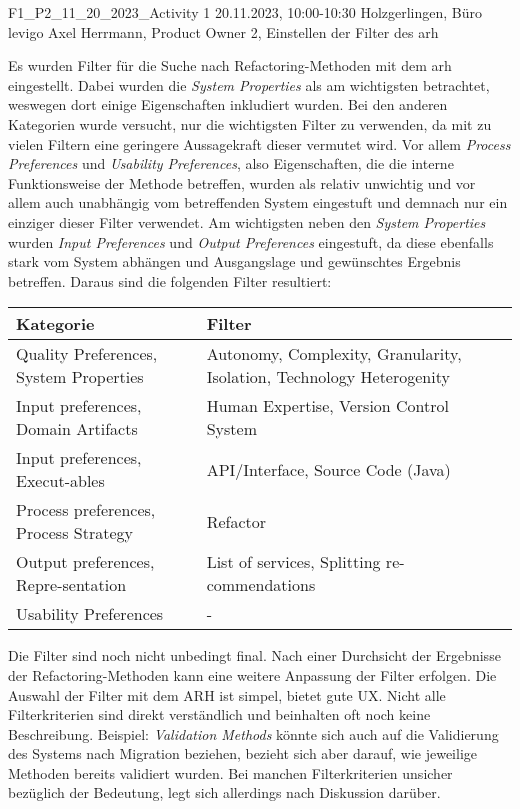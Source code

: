 \fieldnote
{F1\_P2\_11\_20\_2023\_Activity}
{1}
{20.11.2023, 10:00-10:30}
{Holzgerlingen, Büro levigo}
{Axel Herrmann, Product Owner}
{2, Einstellen der Filter des \gls{arh}}
{
	Es wurden Filter für die Suche nach Refactoring-Methoden mit dem \gls{arh} eingestellt. 
	Dabei wurden die \emph{System Properties} als am wichtigsten betrachtet, weswegen dort einige Eigenschaften inkludiert wurden.
	Bei den anderen Kategorien wurde versucht, nur die wichtigsten Filter zu verwenden, da mit zu vielen Filtern eine geringere Aussagekraft dieser vermutet wird.
	Vor allem \emph{Process Preferences} und \emph{Usability Preferences}, also Eigenschaften, die die interne Funktionsweise der Methode betreffen, wurden als relativ unwichtig und vor allem auch unabhängig vom betreffenden System eingestuft und demnach nur ein einziger dieser Filter verwendet.
	Am wichtigsten neben den \emph{System Properties} wurden \emph{Input Preferences} und \emph{Output Preferences} eingestuft, da diese ebenfalls stark vom System abhängen und Ausgangslage und gewünschtes Ergebnis betreffen.
	Daraus sind die folgenden Filter resultiert:
	\begin{tabular}{|p{4.5cm}|p{5.5cm}|}
		\hline
		\textbf{Kategorie} & \textbf{Filter} \\ \hline
		Quality Preferences, System Properties & Autonomy, Complexity, Granularity, Isolation, Technology Heterogenity \\ \hline
		Input preferences, Domain Artifacts & Human Expertise, Version Control System \\ \hline
		Input preferences, Execut-ables & API/Interface, Source Code (Java) \\ \hline
		Process preferences, Process Strategy & Refactor \\ \hline
		Output preferences, Repre-sentation & List of services, Splitting re-commendations \\ \hline
		Usability Preferences & - \\ \hline
	\end{tabular}
}
{
	Die Filter sind noch nicht unbedingt final. Nach einer Durchsicht der Ergebnisse der Refactoring-Methoden kann eine weitere Anpassung der Filter erfolgen.
}
{
	Die Auswahl der Filter mit dem ARH ist simpel, bietet gute UX.
}
{
	Nicht alle Filterkriterien sind direkt verständlich und beinhalten oft noch keine Beschreibung. Beispiel: \emph{Validation Methods} könnte sich auch auf die Validierung des Systems nach Migration beziehen, bezieht sich aber darauf, wie jeweilige Methoden bereits validiert wurden.
}
{
	Bei manchen Filterkriterien unsicher bezüglich der Bedeutung, legt sich allerdings nach Diskussion darüber.
}